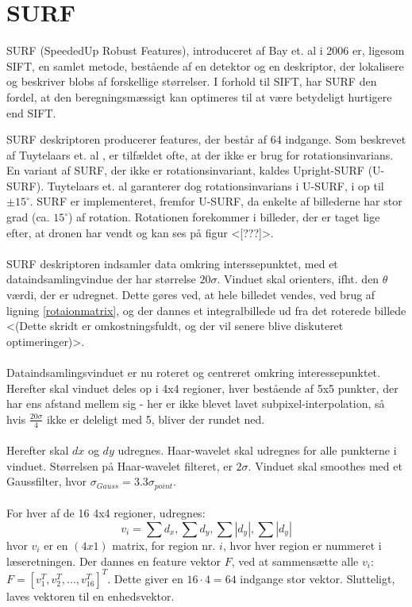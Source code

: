 \section{SURF}
SURF (SpeededUp Robust Features), introduceret af Bay et. al \cite{SURF} i 2006 er, ligesom SIFT, en samlet metode, bestående af en detektor og en deskriptor, der lokalisere og beskriver blobs af forskellige størrelser. I forhold til SIFT, har SURF den fordel, at den beregningsmæssigt kan optimeres til at være betydeligt hurtigere end SIFT.


SURF deskriptoren producerer features, der består af 64 indgange. Som beskrevet af Tuytelaars et. al \cite{SURF}, er tilfældet ofte, at der ikke er brug for rotationsinvarians. En variant af SURF, der ikke er rotationsinvariant, kaldes Upright-SURF (U-SURF). Tuytelaars et. al garanterer dog rotationsinvarians i U-SURF, i op til $\pm 15^{\circ}$. SURF er implementeret, fremfor U-SURF, da enkelte af billederne har stor grad (ca. $15^{\circ}$) af rotation. Rotationen forekommer i billeder, der er taget lige efter, at dronen har vendt og kan ses på figur <[???]>.
\\
\\
SURF deskriptoren indsamler data omkring interssepunktet, med et dataindsamlingvindue der har størrelse $20 \sigma$. Vinduet skal orienters, ifht. den $\theta$ værdi, der er udregnet. Dette gøres ved, at hele billedet vendes, ved brug af ligning \eqref{rotaionmatrix}, og der dannes et integralbillede ud fra det roterede billede <(Dette skridt er omkostningsfuldt, og der vil senere blive diskuteret optimeringer)>.
\\
\\
Dataindsamlingsvinduet er nu roteret og centreret omkring interessepunktet. Herefter skal vinduet deles op i 4x4 regioner, hver bestående af 5x5 punkter, der har ens afstand mellem sig - her er ikke blevet lavet subpixel-interpolation, så hvis $\frac{20\sigma}{4}$ ikke er deleligt med 5, bliver der rundet ned.
\\
\\
Herefter skal $dx$ og $dy$ udregnes. Haar-wavelet skal udregnes for alle punkterne i vinduet. Størrelsen på Haar-wavelet filteret, er $2\sigma$. Vinduet skal smoothes med et Gaussfilter, hvor $\sigma_{Gauss} = 3.3\sigma_{point}$.
\\
\\
For hver af de 16 4x4 regioner, udregnes: 
\begin{equation}
v_i = \sum d_x, \sum d_y, \sum |d_y|, \sum |d_y|
\label{surffeature}
\end{equation}
hvor $v_i$ er en $(4x1)$ matrix, for region nr. $i$, hvor hver region er nummeret i læseretningen. Der dannes en feature vektor $F$, ved at sammensætte alle $v_i$: $F = [v_1^T, v_2^T,..., v_16^T]^T$. Dette giver en $16 \cdot 4 = 64$ indgange stor vektor. Slutteligt, laves vektoren til en enhedsvektor.

